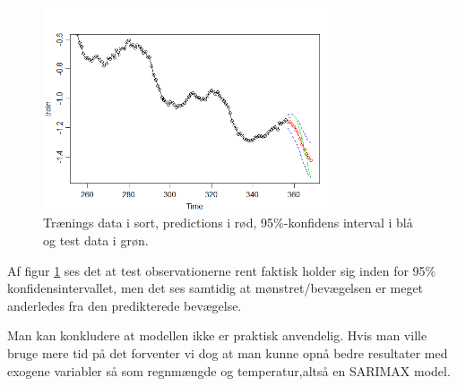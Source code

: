\begin{figure}[H]
\centering
\includegraphics[height=6cm]{figures/tsPredictions}
\caption{Trænings data i sort, predictions i rød, 95\%-konfidens interval i blå og test data i grøn.}
\label{fig:ts-crossvalidate}
\end{figure}

Af figur \ref{fig:ts-crossvalidate} ses det at test observationerne rent faktisk holder sig inden for 95\% konfidensintervallet,
men det ses samtidig at mønstret/bevægelsen er meget anderledes fra den predikterede bevægelse.

Man kan konkludere at modellen ikke er praktisk anvendelig.
Hvis man ville bruge mere tid på det forventer vi dog at man kunne opnå bedre resultater med exogene variabler så som regnmængde
 og temperatur,altså en SARIMAX model.
